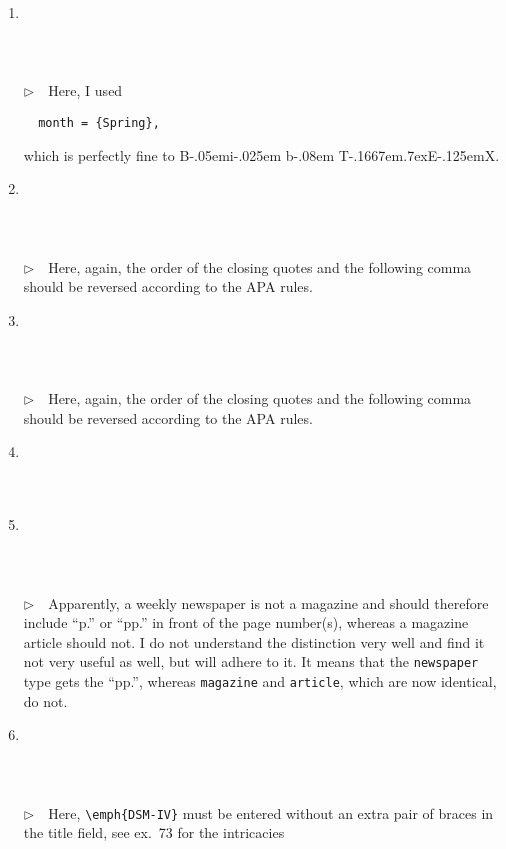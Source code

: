 \documentclass{article}
\def\BibTeX{{\rm B\kern-.05em{\sc i\kern-.025em b}\kern-.08em
    T\kern-.1667em\lower.7ex\hbox{E}\kern-.125emX}}%
\newcommand{\EM}{\ensuremath{\triangleright\quad}}
\newcommand{\entryname}[1]{\texttt{#1}}%
\begin{document}
\begin{enumerate}
\item \cite{ex7}  \\ \cite{ex7} \\  \\ \\
      \EM Here, I used
\begin{verbatim}
  month = {Spring},
\end{verbatim}
      which is perfectly fine to \BibTeX{}.
\item \cite{ex8}  \\ \cite{ex8} \\  \\ \\
      \EM Here, again, the order of the closing quotes and the
      following comma should be reversed according to the APA rules.
\item \cite{ex9}  \\ \cite{ex9} \\  \\ \\
      \EM Here, again, the order of the closing quotes and the
      following comma should be reversed according to the APA rules.
\item \cite{ex10} \\ \cite{ex10}\\ \\ 
\item \cite{ex11} \\ \cite{ex11}\\ \\ \\
      \EM Apparently, a weekly newspaper is not a magazine and should
      therefore include ``p.'' or ``pp.'' in front of the page
      number(s), whereas a magazine article should not. I do not
      understand the distinction very well and find it not very
      useful as well, but will adhere to it. It means that the
      \entryname{newspaper} type gets the ``pp.'', whereas
      \entryname{magazine} and \entryname{article}, which are now
      identical, do not.
\item \cite{ex12} \\ \cite{ex12}\\ \\ \\
      \EM Here, \verb+\emph{DSM-IV}+ must be entered without an extra
      pair of braces in the title field, see ex.~73 for the intricacies

\end{enumerate}
\end{document}
